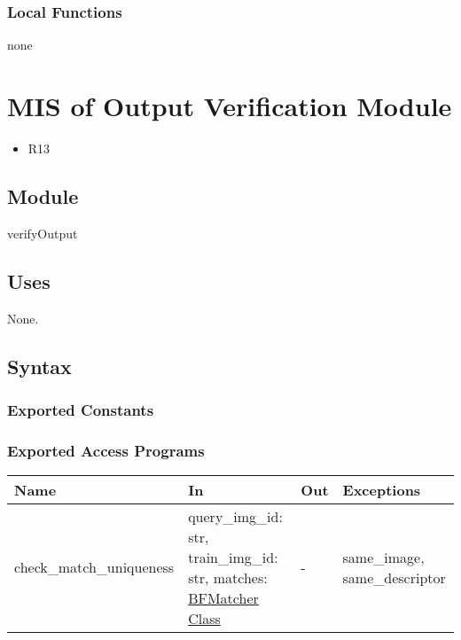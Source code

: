 \documentclass[12pt, titlepage]{article}
\begin{document}
\subsubsection{Local Functions}
none

\section{MIS of Output Verification Module} \label{mOV}
\begin{itemize}
  \item R13
\end{itemize}
\subsection{Module}

verifyOutput

\subsection{Uses}
None.

\subsection{Syntax}

\subsubsection{Exported Constants}

\subsubsection{Exported Access Programs}

\begin{center}
\begin{tabular}{p{4.5cm} p{4cm} p{4cm} p{3cm}}
\hline
\textbf{Name} & \textbf{In} & \textbf{Out} & \textbf{Exceptions} \\
\hline
check\_match\_uniqueness 
& query\_img\_id: str, \newline
train\_img\_id: str, \newline
matches: \href{https://docs.opencv.org/3.4/d3/da1/classcv_1_1BFMatcher.html}{BFMatcher Class}
& -  
& same\_image, \newline
same\_descriptor \\
\hline
\end{tabular}
\end{center}
\end{document}

